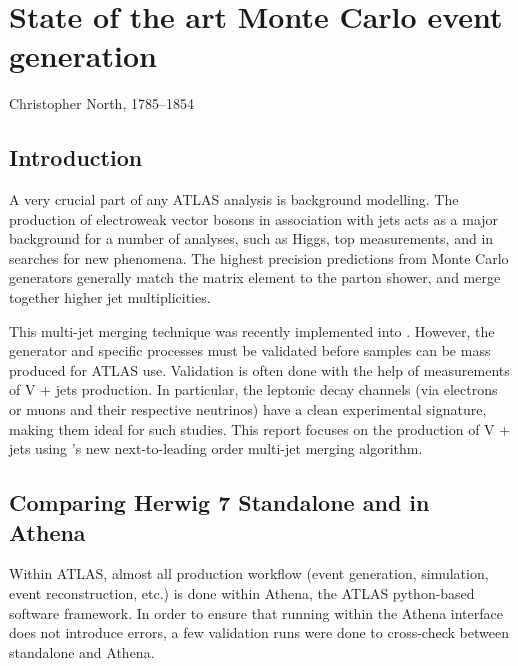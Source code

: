 \chapter{State of the art Monte Carlo event generation}
\label{chap:pheno}



%
{Christopher North, 1785--1854}%

\section{Introduction}
A very crucial part of any ATLAS analysis is background modelling. The production of electroweak vector bosons in association with jets acts as a major background for a number of analyses, such as Higgs, top measurements, and in searches for new phenomena. The highest precision predictions from Monte Carlo generators generally match the matrix element to the parton shower, and merge together higher jet multiplicities. 

This multi-jet merging technique was recently implemented into . However, the generator and specific processes must be validated before samples can be mass produced for ATLAS use. Validation is often done with the help of measurements of V + jets production. In particular, the leptonic decay channels (via electrons or muons and their respective neutrinos) have a clean experimental signature, making them ideal for such studies. This report focuses on the production of V + jets using 's new next-to-leading order multi-jet merging algorithm.

\section{Comparing Herwig 7 Standalone and in Athena}
\noindent
Within ATLAS, almost all production workflow (event generation, simulation, event reconstruction, etc.) is done within Athena, the ATLAS python-based software framework. In order to ensure that running  within the Athena interface does not introduce errors, a few validation runs were done to cross-check between  standalone and Athena. 

